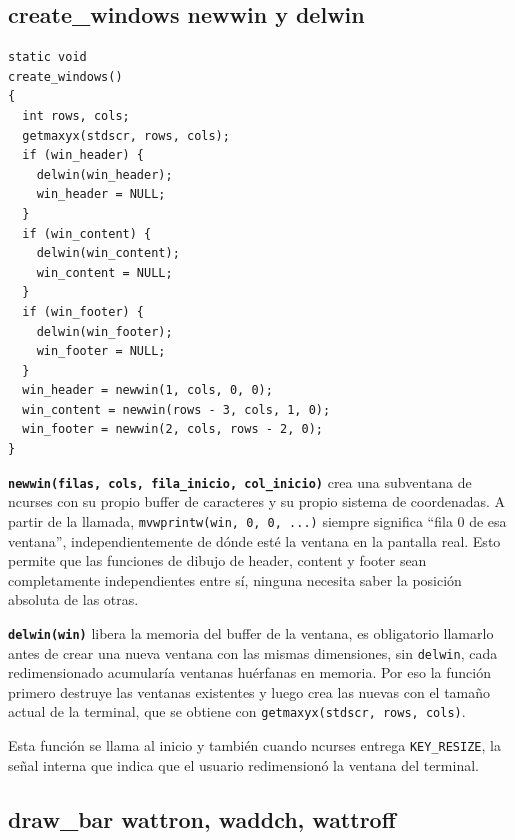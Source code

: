 \documentclass[12pt,letterpaper]{article}
\begin{document}
\subsection*{create\_windows newwin y delwin}

\begin{lstlisting}[style=modernc, caption={\texttt{ui.c} create\_windows()}]
static void
create_windows()
{
  int rows, cols;
  getmaxyx(stdscr, rows, cols);
  if (win_header) {
    delwin(win_header);
    win_header = NULL;
  }
  if (win_content) {
    delwin(win_content);
    win_content = NULL;
  }
  if (win_footer) {
    delwin(win_footer);
    win_footer = NULL;
  }
  win_header = newwin(1, cols, 0, 0);
  win_content = newwin(rows - 3, cols, 1, 0);
  win_footer = newwin(2, cols, rows - 2, 0);
}
\end{lstlisting}

\textbf{\texttt{newwin(filas, cols, fila\_inicio, col\_inicio)}} crea una subventana de ncurses con su propio
buffer de caracteres y su propio sistema de coordenadas. A partir de la llamada,
\texttt{mvwprintw(win, 0, 0, ...)} siempre significa ``fila 0 de esa ventana'', independientemente de dónde
esté la ventana en la pantalla real. Esto permite que las funciones de dibujo de header, content y footer sean
completamente independientes entre sí, ninguna necesita saber la posición absoluta de las otras.

\medskip

\textbf{\texttt{delwin(win)}} libera la memoria del buffer de la ventana, es obligatorio llamarlo antes de crear
una nueva ventana con las mismas dimensiones, sin \texttt{delwin}, cada redimensionado acumularía ventanas
huérfanas en memoria. Por eso la función primero destruye las ventanas existentes y luego crea las nuevas con
el tamaño actual de la terminal, que se obtiene con \texttt{getmaxyx(stdscr, rows, cols)}.

\medskip

Esta función se llama al inicio y también cuando ncurses entrega \texttt{KEY\_RESIZE}, la señal interna que
indica que el usuario redimensionó la ventana del terminal.

\subsection*{draw\_bar wattron, waddch, wattroff}
\end{document}
